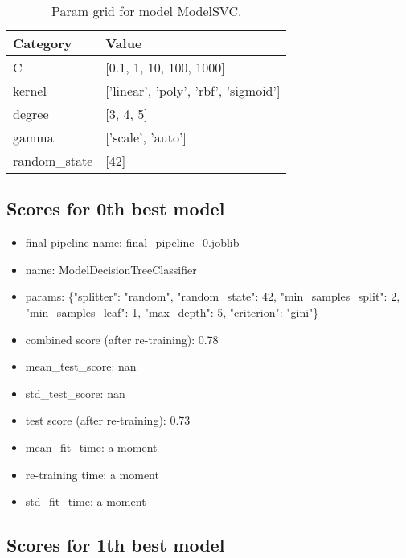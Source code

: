 \documentclass{article}%
\begin{document}
%


\begin{table}[H]%
\begin{center}%
\begin{tabular}{l l}%
\hline%
\textbf{Category}&\textbf{Value}\\%
\hline%
C&{[}0.1, 1, 10, 100, 1000{]}\\%
kernel&{[}'linear', 'poly', 'rbf', 'sigmoid'{]}\\%
degree&{[}3, 4, 5{]}\\%
gamma&{[}'scale', 'auto'{]}\\%
random\_state&{[}42{]}\\%
\hline%
\end{tabular}%
\end{center}%
\caption{Param grid for model ModelSVC.}%
\end{table}

%
\subsection{Scores for 0th best model}%
\label{subsec:Scoresfor0thbestmodel}%

%
\begin{itemize}%
\item%
final pipeline name: final\_pipeline\_0.joblib%
\item%
name: ModelDecisionTreeClassifier%
\item%
params: \{"splitter": "random", "random\_state": 42, "min\_samples\_split": 2, "min\_samples\_leaf": 1, "max\_depth": 5, "criterion": "gini"\}%
\item%
combined score (after re{-}training): 0.78%
\item%
mean\_test\_score: nan%
\item%
std\_test\_score: nan%
\item%
test score (after re{-}training): 0.73%
\item%
mean\_fit\_time: a moment%
\item%
re{-}training time: a moment%
\item%
std\_fit\_time: a moment%
\end{itemize}%
\subsection{Scores for 1th best model}%
\label{subsec:Scoresfor1thbestmodel}%
\end{document}
